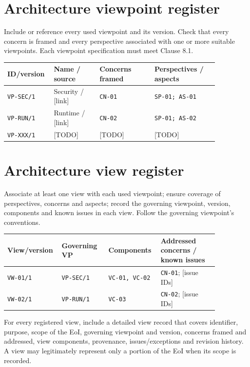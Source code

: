 \documentclass[11pt,letterpaper]{article}
\begin{document}
\section{Architecture viewpoint register \texorpdfstring{}{(6.6, 8.1)}}
\begin{Requirement}\FlagReq{} Include or reference every used viewpoint and its version. Check that every concern is framed and every perspective associated with one or more suitable viewpoints. Each viewpoint specification must meet Clause 8.1. \end{Requirement}
\begin{longtable}{p{0.14\linewidth}p{0.2\linewidth}p{0.24\linewidth}p{0.28\linewidth}}\toprule
\textbf{ID/version}&\textbf{Name / source}&\textbf{Concerns framed}&\textbf{Perspectives / aspects}\\\midrule\endhead
\texttt{VP-SEC/1}&Security / [link]&\texttt{CN-01}&\texttt{SP-01; AS-01}\\
\texttt{VP-RUN/1}&Runtime / [link]&\texttt{CN-02}&\texttt{SP-01; AS-02}\\
\texttt{VP-XXX/1}&[TODO]&[TODO]&[TODO]\\\bottomrule\end{longtable}
\section{Architecture view register \texorpdfstring{}{(6.7)}}
\begin{Requirement}\FlagReq{} Associate at least one view with each used viewpoint; ensure coverage of perspectives, concerns and aspects; record the governing viewpoint, version, components and known issues in each view. Follow the governing viewpoint's conventions. \end{Requirement}
\begin{longtable}{p{0.17\linewidth}p{0.21\linewidth}p{0.22\linewidth}p{0.26\linewidth}}\toprule
\textbf{View/version}&\textbf{Governing VP}&\textbf{Components}&\textbf{Addressed concerns / known issues}\\\midrule\endhead
\texttt{VW-01/1}&\texttt{VP-SEC/1}&\texttt{VC-01, VC-02}&\texttt{CN-01}; [issue IDs]\\
\texttt{VW-02/1}&\texttt{VP-RUN/1}&\texttt{VC-03}&\texttt{CN-02}; [issue IDs]\\\bottomrule\end{longtable}
\begin{Guidance}For every registered view, include a detailed view record that covers identifier, purpose, scope of the EoI, governing viewpoint and version, concerns framed and addressed, view components, provenance, issues/exceptions and revision history. A view may legitimately represent only a portion of the EoI when its scope is recorded.\end{Guidance}
\end{document}
